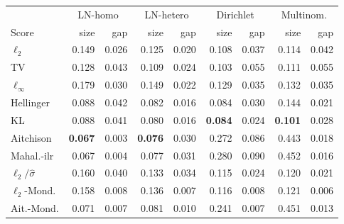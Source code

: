 \begin{tabular}{lrrrrrrrr}
\toprule
 & \multicolumn{2}{c}{LN-homo} & \multicolumn{2}{c}{LN-hetero} & \multicolumn{2}{c}{Dirichlet} & \multicolumn{2}{c}{Multinom.} \\
Score & size & gap & size & gap & size & gap & size & gap \\
\midrule
$\ell_2$ & 0.149 & 0.026 & 0.125 & 0.020 & 0.108 & 0.037 & 0.114 & 0.042 \\
TV & 0.128 & 0.043 & 0.109 & 0.024 & 0.103 & 0.055 & 0.111 & 0.055 \\
$\ell_\infty$ & 0.179 & 0.030 & 0.149 & 0.022 & 0.129 & 0.035 & 0.132 & 0.035 \\
Hellinger & 0.088 & 0.042 & 0.082 & 0.016 & 0.084 & 0.030 & 0.144 & 0.021 \\
KL & 0.088 & 0.041 & 0.080 & 0.016 & \textbf{0.084} & 0.024 & \textbf{0.101} & 0.028 \\
Aitchison & \textbf{0.067} & 0.003 & \textbf{0.076} & 0.030 & 0.272 & 0.086 & 0.443 & 0.018 \\
Mahal.-ilr & 0.067 & 0.004 & 0.077 & 0.031 & 0.280 & 0.090 & 0.452 & 0.016 \\
$\ell_2/\hat\sigma$ & 0.160 & 0.040 & 0.133 & 0.034 & 0.115 & 0.024 & 0.120 & 0.021 \\
$\ell_2$-Mond. & 0.158 & 0.008 & 0.136 & 0.007 & 0.116 & 0.008 & 0.121 & 0.006 \\
Ait.-Mond. & 0.071 & 0.007 & 0.081 & 0.010 & 0.241 & 0.007 & 0.451 & 0.013 \\
\bottomrule
\end{tabular}